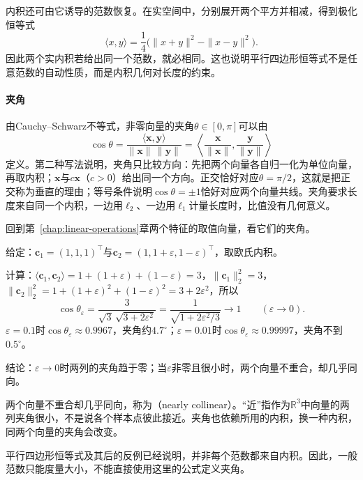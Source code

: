 内积还可由它诱导的范数恢复。在实空间中，分别展开两个平方并相减，得到极化恒等式
\[
 \langle x,y\rangle=\frac14\bigl(\|x+y\|^2-\|x-y\|^2\bigr).
\]
因此两个实内积若给出同一个范数，就必相同。这也说明平行四边形恒等式不是任意范数的自动性质，而是内积几何对长度的约束。

\paragraph{夹角}
由Cauchy--Schwarz不等式，非零向量的夹角$\theta\in[0,\pi]$可以由
\[
 \cos\theta=\frac{\langle\bm x,\bm y\rangle}{\lVert\bm x\rVert\,\lVert\bm y\rVert}
 =\left\langle\frac{\bm x}{\lVert\bm x\rVert},\frac{\bm y}{\lVert\bm y\rVert}\right\rangle
\]
定义。第二种写法说明，夹角只比较方向：先把两个向量各自归一化为单位向量，再取内积；$\bm x$与$c\bm x$（$c>0$）给出同一个方向。正交恰好对应$\theta=\pi/2$，这就是把正交称为垂直的理由；等号条件说明$\cos\theta=\pm1$恰好对应两个向量共线。夹角要求长度来自同一个内积，一边用$\ell_2$、一边用$\ell_1$计量长度时，比值没有几何意义。

回到第~\ref{chap:linear-operations}章两个特征的取值向量，看它们的夹角。
\begin{example}[贯穿例两列的夹角]
\label{ex:ls-nearly-collinear-angle}
给定：$\bm c_1=(1,1,1)^\top$与$\bm c_2=(1,1+\varepsilon,1-\varepsilon)^\top$，取欧氏内积。

计算：$\langle\bm c_1,\bm c_2\rangle=1+(1+\varepsilon)+(1-\varepsilon)=3$，$\lVert\bm c_1\rVert_2^2=3$，$\lVert\bm c_2\rVert_2^2=1+(1+\varepsilon)^2+(1-\varepsilon)^2=3+2\varepsilon^2$，所以
\begin{equation}
 \cos\theta_\varepsilon=\frac{3}{\sqrt3\,\sqrt{3+2\varepsilon^2}}
 =\frac{1}{\sqrt{1+2\varepsilon^2/3}}\longrightarrow1\qquad(\varepsilon\to0).
 \label{eq:linear-algebra-nearly-collinear-angle}
\end{equation}
$\varepsilon=0.1$时$\cos\theta_\varepsilon\approx0.9967$，夹角约$4.7^\circ$；$\varepsilon=0.01$时$\cos\theta_\varepsilon\approx0.99997$，夹角不到$0.5^\circ$。

结论：$\varepsilon\to0$时两列的夹角趋于零；当$\varepsilon$非零且很小时，两个向量不重合，却几乎同向。
\end{example}
两个向量不重合却几乎同向，称为（nearly collinear）。“近”指作为$\mathbb R^3$中向量的两列夹角很小，不是说各个样本点彼此接近。夹角也依赖所用的内积，换一种内积，同两个向量的夹角会改变。

平行四边形恒等式及其后的反例已经说明，并非每个范数都来自内积。因此，一般范数只能度量大小，不能直接使用这里的公式定义夹角。

